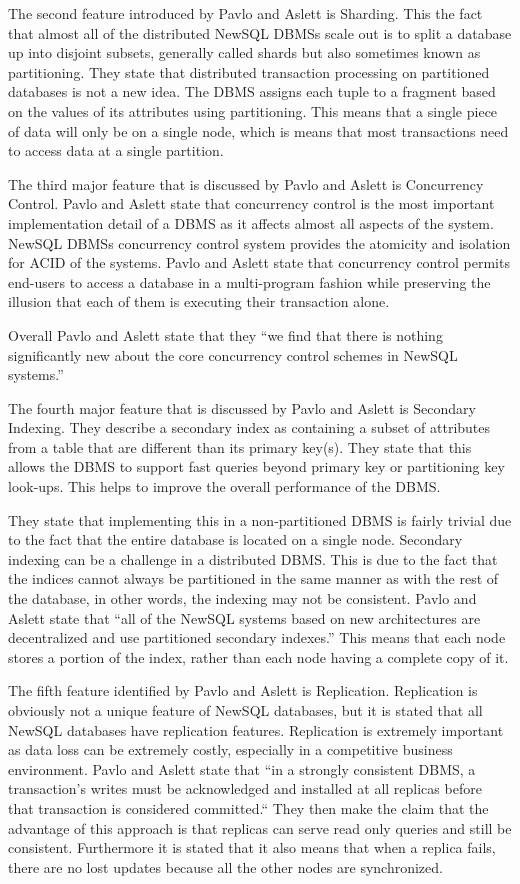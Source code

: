 \documentclass[10pt, conference]{IEEEtran}
\begin{document}
The second feature introduced by Pavlo and Aslett is Sharding. This the fact that almost all of the distributed NewSQL DBMSs scale out is to split a database up into disjoint subsets, generally called shards but also sometimes known as partitioning. They state that distributed transaction processing on partitioned databases is not a new idea. The DBMS assigns each tuple to a fragment based on the values of its attributes using partitioning. This means that a single piece of data will only be on a single node, which is means that most transactions need to access data at a single partition.

The third major feature that is discussed by Pavlo and Aslett is Concurrency Control. Pavlo and Aslett state that concurrency control is the most important implementation detail of a DBMS as it affects almost all aspects of the system. NewSQL DBMSs concurrency control system provides the atomicity and isolation for ACID of the systems. Pavlo and Aslett state that concurrency control permits end-users to access a database in a multi-program fashion while preserving the illusion that each of them is executing their transaction alone. 

Overall Pavlo and Aslett state that they ``we find that there is nothing significantly new about the core concurrency control schemes in NewSQL systems.''  \cite{pavlo}

The fourth major feature that is discussed by Pavlo and Aslett is Secondary Indexing. They describe a secondary index as containing a subset of attributes from a table that are different than its primary key(s). They state that this allows the DBMS to support fast queries beyond primary key or partitioning key look-ups. This helps to improve the overall performance of the DBMS.

They state that implementing this in a non-partitioned DBMS is fairly trivial due to the fact that the entire database is located on a single node. Secondary indexing can be a challenge in a distributed DBMS. This is due to the fact that the indices cannot always be partitioned in the same manner as with the rest of the database, in other words, the indexing may not be consistent. Pavlo and Aslett state that ``all of the NewSQL systems based on new architectures are decentralized and use partitioned secondary indexes.'' This means that each node stores a portion of the index, rather than each node having a complete copy of it. 

The fifth feature identified by Pavlo and Aslett is Replication. Replication is obviously not a unique feature of NewSQL databases, but it is stated that all NewSQL databases have replication features. Replication is extremely important as data loss can be extremely costly, especially in a competitive business environment. Pavlo and Aslett state that ``in a strongly consistent DBMS, a transaction's writes must be acknowledged and installed at all replicas before that transaction is considered committed.``  \cite{pavlo} They then make the claim that the advantage of this approach is that replicas can serve read only queries and still be consistent. Furthermore it is stated that it also means that when a replica fails, there are no lost updates because all the other nodes are synchronized. 
\end{document}
